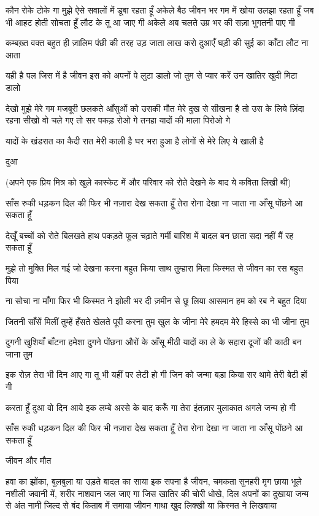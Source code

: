 कौन रोके टोके गा मुझे
ऐसे सवालों में डूबा रहता हूँ
अकेले बैठ जीवन भर
गम में खोया उलझा रहता हूँ
जब भी आहट होती सोचता हूँ
लौट के तू आ जाए गी
अकेले अब चलते उम्र भर की
सज़ा भुगतनी पाए गी

कम्बख़्त वक्त बहुत ही ज़ालिम
पंछी की तरह उड़ जाता
लाख करो दुआएँ घड़ी की
सुई का काँटा लौट ना आता



यही है पल जिस में है जीवन
इस को अपनों पे लुटा डालो
जो तुम से प्यार करें
उन खातिर खुदी मिटा डालो

देखो मुझे मेरे गम मजबूरी
छलकते आँसुओं को
उसकी मौत मेरे दुख से सीखना है
तो उस के लिये ज़िंदा रहना सीखो
वो चले गए तो सर पकड़ रोओ गे
तनहा यादों की माला पिरोओ गे

यादों के खंडरात का कैदी रात मेरी काली है
घर भरा हुआ है लोगों से मेरे लिए ये खाली है






दुआ


(अपने एक प्रिय मित्र को खुले कास्केट में
और परिवार को रोते देखने के बाद ये कविता
लिखी थी)

साँस रुकी धड़कन दिल की
फिर भी नज़ारा देख सकता हूँ
तेरा रोना देखा ना जाता
ना आँसू पोंछने आ सकता हूँ

देखूँ बच्चों को रोते बिलखते
हाथ पकड़ते फूल चढ़ाते
गर्मी बारिश में बादल बन छाता
सदा नहीं मैं रह सकता हूँ

मुझे तो मुक्ति मिल गई
जो देखना करना बहुत किया
साथ तुम्हारा मिला किस्मत से
जीवन का रस बहुत पिया


ना सोचा ना माँगा फिर भी
किस्मत ने झोली भर दी
ज़मीन से छू लिया आसमान
हम को रब ने बहुत दिया

जितनी साँसें मिलीं तुम्हें
हँसते खेलते पूरी करना तुम
खुल के जीना मेरे हमदम
मेरे हिस्से का भी जीना तुम


दुगनी खुशियाँ बाँटना हमेशा
दुगने पोंछना औरों के आँसू
मीठी यादों का ले के सहारा
दूजों की काठी बन जाना तुम

इक रोज़ तेरा भी दिन आए गा
तू भी यहीं पर लेटी हो गी
जिन को जन्मा बड़ा किया
सर थामे तेरी बेटी हों गी


करता हूँ दुआ वो दिन आये
इक लम्बे अरसे के बाद
करूँ गा तेरा इंतज़ार
मुलाकात अगले जन्म हो गी

साँस रुकी धड़कन दिल की
फिर भी नज़ारा देख सकता हूँ
तेरा रोना देखा ना जाता
ना आँसू पोंछने आ सकता हूँ
         
         जीवन और मौत

हवा का झोंका, बुलबुला या उड़ते बादल
का साया
इक सपना है जीवन, चमकता सुनहरी मृग
छाया
भूले नशीली जवानी में, शरीर नाशवान जल
जाए गा
जिस खातिर की चोरी धोखे, दिल अपनों का
दुखाया
जन्म से अंत नामी जिल्द से
बंद किताब में समाया
जीवन गाथा खुद लिक्खी या
किस्मत ने लिखवाया


